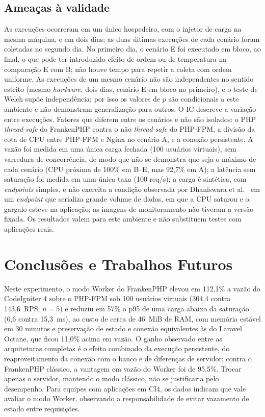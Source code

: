 \subsection{Ameaças à validade}
As execuções ocorreram em um único hospedeiro, com o injetor de carga na mesma máquina, e em dois dias; as duas últimas execuções de cada cenário foram coletadas no segundo dia. No primeiro dia, o cenário E foi executado em bloco, ao final, o que pode ter introduzido efeito de ordem ou de temperatura na comparação E com B; não houve tempo para repetir a coleta com ordem uniforme. As execuções de um mesmo cenário não são independentes no sentido estrito (mesmo \textit{hardware}, dois dias, cenário E em bloco no primeiro), e o teste de Welch supõe independência; por isso os valores de $p$ são condicionais a este ambiente e não demonstram generalização para outros. O IC descreve a variação entre execuções. Fatores que diferem entre os cenários e não são isolados: o PHP \textit{thread-safe} do FrankenPHP contra o não \textit{thread-safe} do PHP-FPM, a divisão da cota de CPU entre PHP-FPM e Nginx no cenário A, e a conexão persistente. A vazão foi medida em uma única carga fechada (100 usuários virtuais), sem varredura de concorrência, de modo que não se demonstra que seja o máximo de cada cenário (CPU próxima de 100\% em B--E, mas 92,7\% em A); a latência sem saturação foi medida em uma única taxa (100 req/s); a carga é sintética, com \textit{endpoints} simples, e não exercita a condição observada por Dhaniswara et al.~\cite{dhaniswara2025} em um \textit{endpoint} que serializa grande volume de dados, em que a CPU saturou e o gargalo esteve na aplicação; as imagens de monitoramento não tiveram a versão fixada. Os resultados valem para este ambiente e não substituem testes com aplicações reais.

\section{Conclusões e Trabalhos Futuros}
Neste experimento, o modo Worker do FrankenPHP elevou em 112,1\% a vazão do CodeIgniter 4 sobre o PHP-FPM sob 100 usuários virtuais (304,4 contra 143,6~RPS; $n=5$) e reduziu em 57\% o p95 de uma carga abaixo da saturação (6,6 contra 15,3~ms), ao custo de cerca de 46~MiB de RAM, com memória estável em 30 minutos e preservação de estado e conexão equivalentes às do Laravel Octane, que ficou 11,0\% acima em vazão. O ganho observado entre as arquiteturas completas é o efeito combinado da execução persistente, do reaproveitamento da conexão com o banco e de diferenças de servidor; contra o FrankenPHP clássico, a vantagem em vazão do Worker foi de 95,5\%. Trocar apenas o servidor, mantendo o modo clássico, não se justificaria pelo desempenho. Para equipes com aplicações em CI4, os dados indicam que vale avaliar o modo Worker, observando a responsabilidade de evitar vazamento de estado entre requisições.

